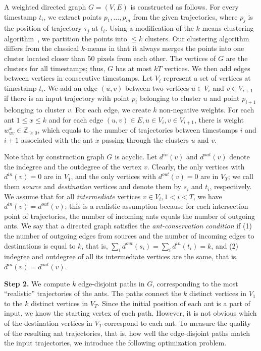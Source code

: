 \documentclass[runningheads]{llncs}
\begin{document}
A weighted directed graph $G=(V,E)$ is constructed as follows. For
every timestamp $t_i$, we extract points $p_1,\dots,p_m$ from the
given trajectories, where $p_j$ is the position of trajectory $\tau_j$
at $t_i$. Using a modification of the $k$-means clustering algorithm~\cite{lloyd82}, we
partition the points into $\le k$ clusters.
Our clustering algorithm
differs from the classical $k$-means in that it always merges the points
into one cluster located closer than $50$ pixels from each other.
The vertices of $G$ are the clusters for all
timestamps; thus, $G$ has at most $kT$ vertices. We then add edges
between vertices in consecutive timestamps. Let $V_i$ represent a set
of vertices at timestamp $t_i$. We add an edge $(u,v)$ between two
vertices $u\in V_i$ and $v\in V_{i+1}$ if there is an input trajectory
with point $p_i$ belonging to cluster $u$ and point $p_{i+1}$
belonging to cluster $v$. For each edge, we create $k$
non-negative weights. For each ant $1\le x \le k$ and for each edge
$(u,v) \in E, u \in V_i, v \in V_{i+1}$, there is weight $w_{uv}^x\in
\mathbb{Z}_{\ge0}$, which equals to the number of trajectories between timestamps
$i$ and $i+1$ associated
with the ant $x$ passing through the clusters $u$ and $v$.

Note that by construction graph $G$ is acyclic. Let $d^{in}(v)$ and
$d^{out}(v)$ denote the indegree and the outdegree of the vertex $v$.
Clearly, the only vertices with $d^{in}(v)=0$ are in $V_1$, and the
only vertices with $d^{out}(v)=0$ are in $V_T$; we call them
\emph{source} and \emph{destination} vertices and denote them by $s_i$ and $t_i$, respectively. We assume that
for all \emph{intermediate} vertices $v\in V_i, 1<i<T$, we have
$d^{in}(v)=d^{out}(v)$; this is a realistic assumption
because for each intersection point of trajectories,
the number of incoming ants equals the number of outgoing ants.
We say that a directed graph satisfies the {\em ant-conservation
condition} if (1) the number of outgoing edges from sources and the
number of incoming edges to destinations is equal to $k$, that is,
$\sum_i d^{out}(s_i) = \sum_i d^{in}(t_i) = k$, and
(2) indegree and outdegree of all its intermediate vertices
are the same, that is, $d^{in}(v)=d^{out}(v)$.

{\bf Step 2.} We compute $k$ edge-disjoint paths in $G$,
corresponding to the most ``realistic'' trajectories of the ants. The
paths connect the $k$ distinct vertices in $V_1$ to the $k$ distinct
vertices in $V_T$. Since the initial position of each ant is a part of
input, we know the starting vertex of each path. However, it is not
obvious which of the destination vertices in $V_T$ correspond to each
ant. To measure the quality of the resulting ant
trajectories, that is, how well the edge-disjoint paths match the
input trajectories, we introduce the following optimization problem.
\end{document}
